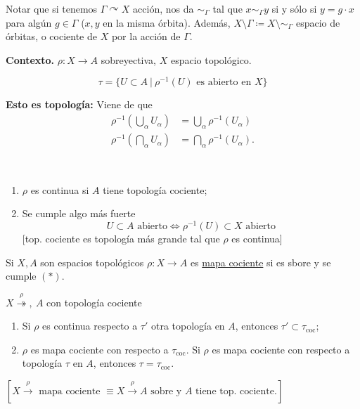 Notar que si tenemos $\Gamma \curvearrowright X$ acción, nos da $\sim_{\Gamma}$ tal que $x \sim_{\Gamma} y$ si y sólo si $y = g\cdot x$ para algún $g \in \Gamma$ ($x,y$ en la misma órbita). Además, $X \setminus \Gamma \coloneq X \setminus \sim_{\Gamma}$ espacio de órbitas, o cociente de $X$ por la acción de $\Gamma$. \newline

\noindent \textbf{Contexto.} $\rho : X \to A$ sobreyectiva, $X$ espacio topológico.

\begin{definition}
	\[ \tau = \{ U \subset A \ \big| \ \rho^{-1}(U) \text{ es abierto en } X \} \]
\end{definition}

\noindent \textbf{Esto es topología:} Viene de que
\begin{align*}
	\rho^{-1}\left(\bigcup_{\alpha} U_{\alpha}\right) & = \bigcup_{\alpha} \rho^{-1}(U_{\alpha}) \\
	\rho^{-1}\left(\bigcap_{\alpha} U_{\alpha}\right) & = \bigcap_{\alpha} \rho^{-1}(U_{\alpha})
.\end{align*}

\begin{observe}~
	\begin{enumerate}
		\item $\rho$ es continua si $A$ tiene topología cociente;

		\item Se cumple algo más fuerte
		\[ U \subset A \text{ abierto} \iff \rho^{-1}(U) \subset X \text{ abierto} \tag{$*$} \]
		[top. cociente es topología más grande tal que $\rho$ es continua]
	\end{enumerate}
\end{observe}

\begin{definition}
	Si $X,A$ son espacios topológicos $\rho:X \to A$ es \underline{mapa cociente} si es sbore y se cumple $(*)$.
\end{definition}

\begin{observe}
	$X \stackrel{\rho}{\twoheadrightarrow},\ A$ con topología cociente
	\begin{enumerate}
		\item Si $\rho$ es continua respecto a $\tau'$ otra topología en $A$, entonces $\tau' \subset \tau_{\text{coc}}$;

		\item $\rho$ es mapa cociente con respecto a $\tau_{\text{coc}}$. Si $\rho$ es mapa cociente con respecto a topología $\tau$ en $A$, entonces $\tau = \tau_{\text{coc}}$.
	\end{enumerate}
	$ [ X \stackrel{\rho}{\to} \text{ mapa cociente } \equiv X \stackrel{\rho}{\to} A \text{ sobre y } A \text{ tiene top. cociente.} ] $
\end{observe}

